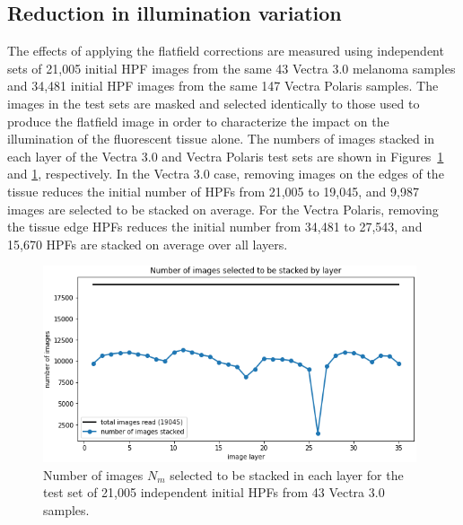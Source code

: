 \documentclass[letterpaper,11pt]{article}
\begin{document}
\subsection{Reduction in illumination variation}
\label{ssec:reduction_in_illumination_variation}

The effects of applying the flatfield corrections are measured using independent sets of 21,005 initial HPF images from the same 43 Vectra 3.0 melanoma samples and 34,481 initial HPF images from the same 147 Vectra Polaris samples. The images in the test sets are masked and selected identically to those used to produce the flatfield image in order to characterize the impact on the illumination of the fluorescent tissue alone. The numbers of images stacked in each layer of the Vectra 3.0 and Vectra Polaris test sets are shown in Figures~\ref{fig:test_set_n_images_stacked_vectra} and \ref{fig:test_set_n_images_stacked_vectra}, respectively. In the Vectra 3.0 case, removing images on the edges of the tissue reduces the initial number of HPFs from 21,005 to 19,045, and 9,987 images are selected to be stacked on average. For the Vectra Polaris, removing the tissue edge HPFs reduces the initial number from 34,481 to 27,543, and 15,670 HPFs are stacked on average over all layers.

\begin{figure}[!ht]
\centering
\includegraphics[width=0.98\textwidth]{images/results/n_images_stacked_per_layer_test_set_vectra}
\caption{\footnotesize Number of images $N_{m}$ selected to be stacked in each layer for the test set of 21,005 independent initial HPFs from 43 Vectra 3.0 samples.}
\label{fig:test_set_n_images_stacked_vectra}
\end{figure} 
\end{document}
